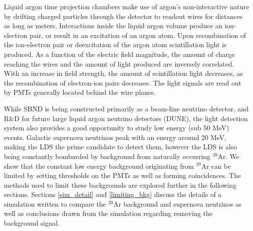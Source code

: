 \documentclass[a4paper]{article}
\begin{document}
Liquid argon time projection chambers make use of argon's non-interactive nature by drifting charged particles through the detector to readout wires for distances as long as meters. Interactions inside the liquid argon volume produce an ion-electron pair, or result in an excitation of an argon atom. Upon recombination of the ion-electron pair or deexcitation of the argon atom scintillation light is produced. As a function of the electric field magnitude, the amount of charge reaching the wires and the amount of light produced are inversely correlated. With an increase in field strength, the amount of scintillation light decreases, as the recombination of electron-ion pairs decreases. The light signals are read out by PMTs generally located behind the wire planes. 

While SBND is being constructed primarily as a beam-line neutrino detector, and R\&D for future large liquid argon neutrino detectors (DUNE), the light detection system also provides a good opportunity to study low energy (sub 50 MeV) events. Galactic supernova neutrinos peak with an energy around 20 MeV, making the LDS the prime candidate to detect them, however the LDS is also being constantly bombarded by background from naturally occurring $^{39}$Ar. We show that the constant low energy background originating from  $^{39}$Ar 
 can be limited by setting thresholds on the PMTs as well as forming coincidences. The methods used to limit these backgrounds are explored further in the following sections. Sections \ref{sim_detail} and \ref{limiting_bkg} discuss the details of a simulation written to compare the $^{39}$Ar background and supernova neutrinos as well as conclusions drawn from the simulation regarding removing the background signal.

\end{document}
